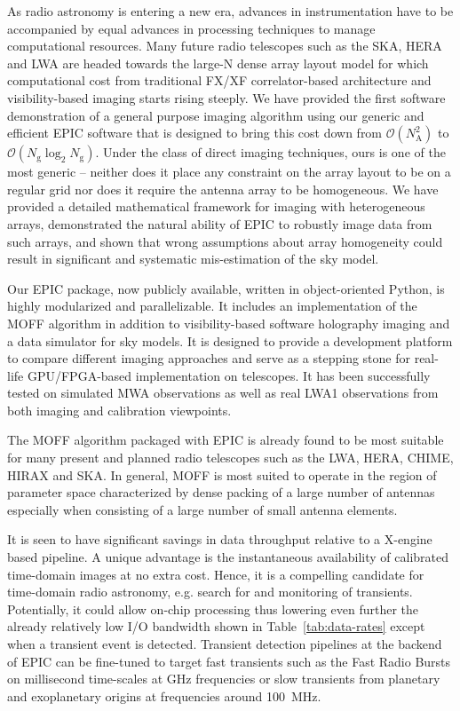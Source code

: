 \documentclass[a4paper,fleqn,usenatbib]{mnras}
\newcommand{\Nant}{N_\textrm{A}}
\newcommand{\Ngrid}{N_\textrm{g}}
\begin{document}
As radio astronomy is entering a new era, advances in instrumentation have to be accompanied by equal advances in processing techniques to manage computational resources. Many future radio telescopes such as the SKA, HERA and LWA are headed towards the large-N dense array layout model for which computational cost from traditional FX/XF correlator-based architecture and visibility-based imaging starts rising steeply. We have provided the first software demonstration of a general purpose imaging algorithm using our generic and efficient EPIC software that is designed to bring this cost down from $\mathcal{O}(\Nant^2)$ to $\mathcal{O}(\Ngrid\log_2 \Ngrid)$. Under the class of direct imaging techniques, ours is one of the most generic -- neither does it place any constraint on the array layout to be on a regular grid nor does it require the antenna array to be homogeneous. We have provided a detailed mathematical framework for imaging with heterogeneous arrays, demonstrated the natural ability of EPIC to robustly image data from such arrays, and shown that wrong assumptions about array homogeneity could result in significant and systematic mis-estimation of the sky model.

Our EPIC package, now publicly available, written in object-oriented Python, is highly modularized and parallelizable. It includes an implementation of the MOFF algorithm in addition to visibility-based software holography imaging and a data simulator for sky models. It is designed to provide a development platform to compare different imaging approaches and serve as a stepping stone for real-life GPU/FPGA-based implementation on telescopes. It has been successfully tested on simulated MWA observations as well as real LWA1 observations from both imaging and calibration viewpoints. 

The MOFF algorithm packaged with EPIC is already found to be most suitable for many present and planned radio telescopes such as the LWA, HERA, CHIME, HIRAX and SKA. In general, MOFF is most suited to operate in the region of parameter space characterized by dense packing of a large number of antennas especially when consisting of a large number of small antenna elements. 

It is seen to have significant savings in data throughput relative to a X-engine based pipeline. A unique advantage is the instantaneous availability of calibrated time-domain images at no extra cost. Hence, it is a compelling candidate for time-domain radio astronomy, e.g. search for and monitoring of transients. Potentially, it could allow on-chip processing thus lowering even further the already relatively low I/O bandwidth shown in Table~\ref{tab:data-rates} except when a transient event is detected. Transient detection pipelines at the backend of EPIC can be fine-tuned to target fast transients such as the Fast Radio Bursts \citep[FRB;][]{tho13} on millisecond time-scales at GHz frequencies or slow transients from planetary and exoplanetary origins at frequencies around 100~MHz. 
\end{document}
